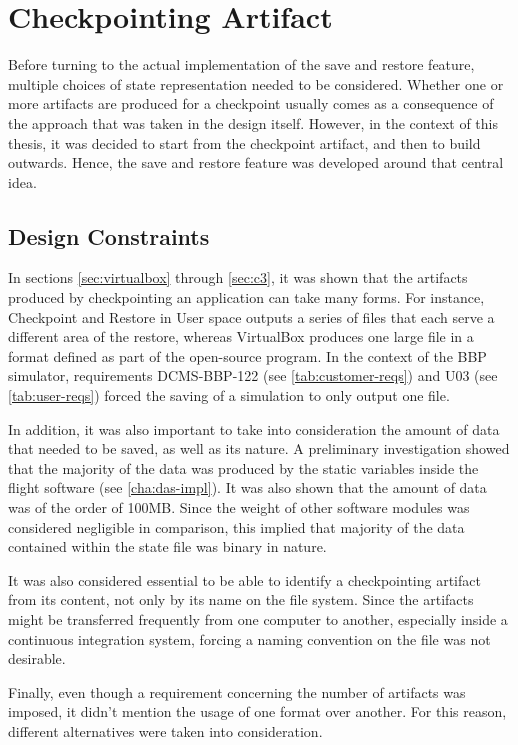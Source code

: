 {
\setlength{\parindent}{2em}
\chapter{Checkpointing Artifact} \label{cha:prod-artifact}
Before turning to the actual implementation of the save and restore feature, multiple choices of state representation needed to be considered. Whether one or more artifacts are produced for a checkpoint usually comes as a consequence of the approach that was taken in the design itself. However, in the context of this thesis, it was decided to start from the checkpoint artifact, and then to build outwards. Hence, the save and restore feature was developed around that central idea.

\section{Design Constraints}\label{sec:file-constraints}
In sections \ref{sec:virtualbox} through \ref{sec:c3}, it was shown that the artifacts produced by checkpointing an application can take many forms. For instance, Checkpoint and Restore in User space outputs a series of files that each serve a different area of the restore, whereas VirtualBox produces one large file in a format defined as part of the open-source program. In the context of the BBP simulator, requirements DCMS-BBP-122 (see \autoref{tab:customer-reqs}) and U03 (see \autoref{tab:user-reqs}) forced the saving of a simulation to only output one file.

In addition, it was also important to take into consideration the amount of data that needed to be saved, as well as its nature. A preliminary investigation showed that the majority of the data was produced by the static variables inside the flight software (see \autoref{cha:das-impl}). It was also shown that the amount of data was of the order of 100MB. Since the weight of other software modules was considered negligible in comparison, this implied that majority of the data contained within the state file was binary in nature.

It was also considered essential to be able to identify a checkpointing artifact from its content, not only by its name on the file system. Since the artifacts might be transferred frequently from one computer to another, especially inside a continuous integration system, forcing a naming convention on the file was not desirable.

Finally, even though a requirement concerning the number of artifacts was imposed, it didn't mention the usage of one format over another. For this reason, different alternatives were taken into consideration. 

}
